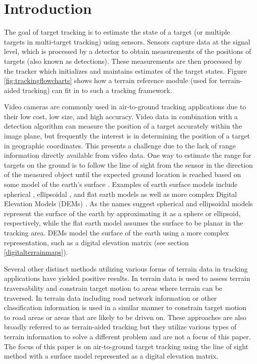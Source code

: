 \documentclass[journal]{IEEEtran}
\begin{document}
\section{Introduction} \label{introduction}
The goal of target tracking is to estimate the state of a target (or multiple targets in multi-target tracking) using sensors. Sensors capture data at the signal level, which is processed by a detector to obtain measurements of the positions of targets (also known as detections). These measurements are then processed by the tracker which initializes and maintains estimates of the target states. Figure \ref{fig:trackingflowcharts} shows how a terrain reference module (used for terrain-aided tracking) can fit in to such a tracking framework.

Video cameras are commonly used in air-to-ground tracking applications due to their low cost, low size, and high accuracy. Video data in combination with a detection algorithm can measure the position of a target accurately within the image plane, but frequently the interest is in determining the position of a target in geographic coordinates. This presents a challenge due to the lack of range information directly available from video data. One way to estimate the range for targets on the ground is to follow the line of sight from the sensor in the direction of the measured object until the expected ground location is reached based on some model of the earth's surface \cite{collins1989terrain, kim2009terrain, collins2000system, mallick2007geolocation}. Examples of earth surface models include spherical \cite{karimi2020edge, rongier2019generative}, ellipsoidal \cite{rongier2019generative}, and flat earth models \cite{mallick2007geolocation} as well as more complex Digital Elevation Models (DEMs) \cite{jpl13,nasa00,robinson2012high,mallick2007geolocation}. As the names suggest spherical and ellipsoidal models represent the surface of the earth by approximating it as a sphere or ellipsoid, respectively, while the flat earth model assumes the surface to be planar in the tracking area. DEMs model the surface of the earth using a more complex representation, such as a digital elevation matrix (see section \ref{digitalterrainmaps}).

Several other distinct methods utilizing various forms of terrain data in tracking applications have yielded positive results. In \cite{fosbury2007ground, lancaster2007imm} terrain data is used to assess terrain traversability and constrain target motion to areas where terrain can be traversed. In \cite{ristic2003beyond, sidenbladh2003tracking} terrain data including road network information or other classification information is used in a similar manner to constrain target motion to road areas or areas that are likely to be driven on. These approaches are also broadly referred to as terrain-aided tracking but they utilize various types of terrain information to solve a different problem and are not a focus of this paper. The focus of this paper is on air-to-ground target tracking using the line of sight method with a surface model represented as a digital elevation matrix.
\end{document}

